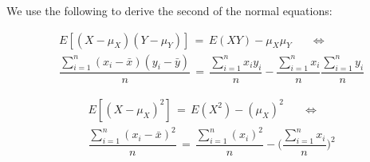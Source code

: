 We use the following to derive the second of the normal equations:

\begin{align*}
    &E[(X - \mu_{X})(Y - \mu_{Y})] \hspace{2pt} = \hspace{2pt} E(XY) - \mu_{X}\mu_{Y} \hspace{20pt} \Longleftrightarrow \\[1ex] 
    &\dfrac{\sum_{i = 1}^{n} (x_{i} - \bar{x})(y_{i} - \bar{y})}{n} \hspace{2pt} = \hspace{2pt} \dfrac{\sum_{i = 1}^{n} x_{i}y_{i}}{n} - \dfrac{\sum_{i = 1}^{n} x_{i}}{n} \dfrac{\sum_{i = 1}^{n} y_{i}}{n}
\end{align*}

\begin{align*}
    &E[(X - \mu_{X})^{2}] \hspace{2pt} = \hspace{2pt} E(X^{2}) - (\mu_{X})^{2} \hspace{20pt} \Longleftrightarrow \\[1ex] 
    &\dfrac{\sum_{i = 1}^{n} (x_{i} - \bar{x})^{2}}{n} \hspace{2pt} = \hspace{2pt} \dfrac{\sum_{i = 1}^{n} (x_{i})^{2}}{n} - \Big(\dfrac{\sum_{i = 1}^{n} x_{i}}{n}\Big)^{2}
\end{align*}

